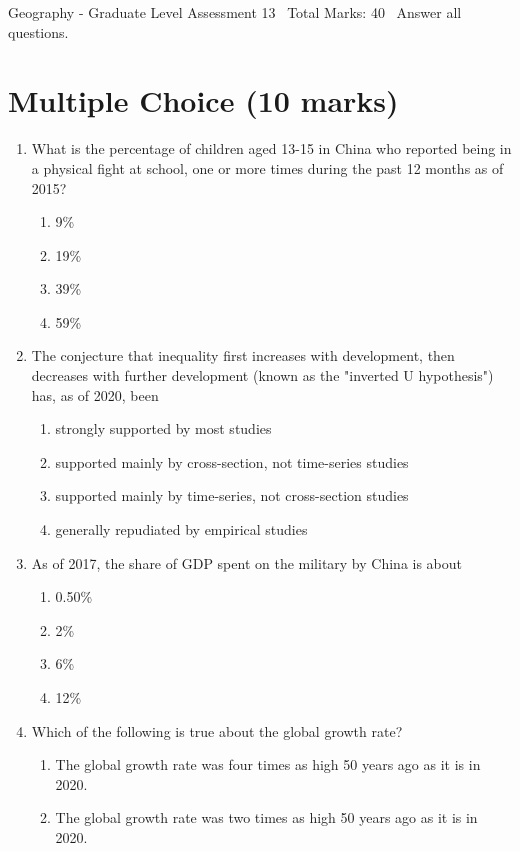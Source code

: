 \documentclass[12pt]{article}
\begin{document}
\begin{center}
Geography - Graduate Level Assessment 13 \
Total Marks: 40 \
Answer all questions.
\end{center}

\section*{Multiple Choice (10 marks)}
\begin{enumerate}[label=\arabic*.]
\item What is the percentage of children aged 13-15 in China who reported being in a physical fight at school, one or more times during the past 12 months as of 2015?
\begin{enumerate}[label=(\alph*)]
    \item 9\%
    \item 19\%
    \item 39\%
    \item 59\%
\end{enumerate}
\item The conjecture that inequality first increases with development, then decreases with further development (known as the "inverted U hypothesis") has, as of 2020, been
\begin{enumerate}[label=(\alph*)]
    \item strongly supported by most studies
    \item supported mainly by cross-section, not time-series studies
    \item supported mainly by time-series, not cross-section studies
    \item generally repudiated by empirical studies
\end{enumerate}
\item As of 2017, the share of GDP spent on the military by China is about
\begin{enumerate}[label=(\alph*)]
    \item 0.50\%
    \item 2\%
    \item 6\%
    \item 12\%
\end{enumerate}
\item Which of the following is true about the global growth rate?
\begin{enumerate}[label=(\alph*)]
    \item The global growth rate was four times as high 50 years ago as it is in 2020.
    \item The global growth rate was two times as high 50 years ago as it is in 2020.

\end{enumerate}
\end{enumerate}
\end{document}
